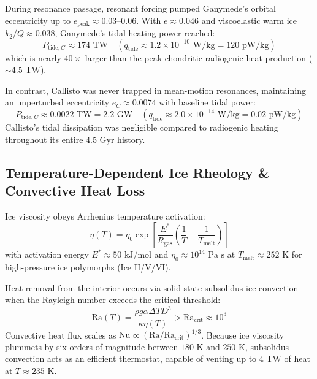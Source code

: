\documentclass[11pt,a4paper]{article}
\begin{document}
During resonance passage, resonant forcing pumped Ganymede's orbital eccentricity up to $e_{\text{peak}} \approx 0.03$--$0.06$. With $e \approx 0.046$ and viscoelastic warm ice $k_2/Q \approx 0.038$, Ganymede's tidal heating power reached:
\begin{equation}
P_{\text{tide}, G} \approx 174\text{ TW} \quad \left(q_{\text{tide}} \approx 1.2 \times 10^{-10}\text{ W/kg} = 120\text{ pW/kg}\right)
\end{equation}
which is nearly $40\times$ larger than the peak chondritic radiogenic heat production ($\sim 4.5\text{ TW}$).

In contrast, Callisto was never trapped in mean-motion resonances, maintaining an unperturbed eccentricity $e_C \approx 0.0074$ with baseline tidal power:
\begin{equation}
P_{\text{tide}, C} \approx 0.0022\text{ TW} = 2.2\text{ GW} \quad \left(q_{\text{tide}} \approx 2.0 \times 10^{-14}\text{ W/kg} = 0.02\text{ pW/kg}\right)
\end{equation}
Callisto's tidal dissipation was negligible compared to radiogenic heating throughout its entire 4.5 Gyr history.

\subsection{Temperature-Dependent Ice Rheology \& Convective Heat Loss}
Ice viscosity obeys Arrhenius temperature activation:
\begin{equation}
\eta(T) = \eta_0 \exp\left[ \frac{E^*}{R_{\text{gas}}} \left( \frac{1}{T} - \frac{1}{T_{\text{melt}}} \right) \right]
\end{equation}
with activation energy $E^* \approx 50\text{ kJ/mol}$ and $\eta_0 \approx 10^{14}\text{ Pa s}$ at $T_{\text{melt}} \approx 252\text{ K}$ for high-pressure ice polymorphs (Ice II/V/VI).

Heat removal from the interior occurs via solid-state subsolidus ice convection when the Rayleigh number exceeds the critical threshold:
\begin{equation}
\text{Ra}(T) = \frac{\rho g \alpha \Delta T D^3}{\kappa \eta(T)} > \text{Ra}_{\text{crit}} \approx 10^3
\end{equation}
Convective heat flux scales as $\text{Nu} \propto (\text{Ra}/\text{Ra}_{\text{crit}})^{1/3}$. Because ice viscosity plummets by six orders of magnitude between $180\text{ K}$ and $250\text{ K}$, subsolidus convection acts as an efficient thermostat, capable of venting up to $4\text{ TW}$ of heat at $T \approx 235\text{ K}$.
\end{document}
